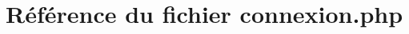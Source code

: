 \hypertarget{connexion_8php}{
\section{R\'{e}f\'{e}rence du fichier connexion.php}
\label{connexion_8php}
}
